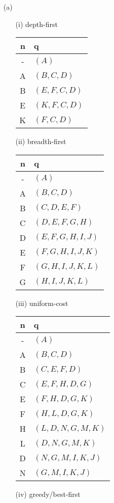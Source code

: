 \begin{enumerate}
\begin{enumerate}
		\item[(a)] 
			\begin{enumerate}
			\item[(i)] depth-first \\
				\begin{tabular}{c|l}
					\bf{n} & \bf{q} \\
					\hline
					- & \((A)\) \\
					A & \((B,C,D)\) \\
					B & \((E,F,C,D)\) \\
					E & \((K,F,C,D)\) \\
					K & \((F,C,D)\) \\
				\end{tabular}
			\item[(ii)] breadth-first \\
				\begin{tabular}{c|l}
					\bf{n} & \bf{q} \\
					\hline 
					- & \((A)\) \\
					A & \((B,C,D)\) \\
					B & \((C,D,E,F)\) \\
					C & \((D,E,F,G,H)\) \\
					D & \((E,F,G,H,I,J)\) \\
					E & \((F,G,H,I,J,K)\) \\
					F & \((G,H,I,J,K,L)\) \\				
					G & \((H,I,J,K,L)\) \\				
				\end{tabular}
			\item[(iii)] uniform-cost \\
				\begin{tabular}{c|l}
					\bf{n} & \bf{q} \\
					\hline 
					- & \((A)\) \\
					A & \((B,C,D)\) \\
					B & \((C,E,F,D)\) \\
					C & \((E,F,H,D,G)\) \\
					E & \((F,H,D,G,K)\) \\
					F & \((H,L,D,G,K)\) \\
					H & \((L,D,N,G,M,K)\) \\
					L & \((D,N,G,M,K)\) \\
					D & \((N,G,M,I,K,J)\) \\
					N & \((G,M,I,K,J)\) \\				
				\end{tabular}
			\item[(iv)] greedy/best-first \\

\end{enumerate}
\end{enumerate}
\end{enumerate}
